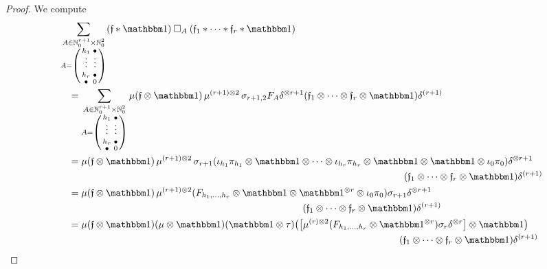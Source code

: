 \documentclass[\MainFolder/Text.tex]{subfiles}
\begin{document}
\begin{proof}
We compute
\begin{align*}
& \sum_{\substack{A \in \N_0^{r+1} \times \N_0^{2} \\ A = \left(\begin{smallmatrix}
h_1 & \bullet \\
\vphantom{\int\limits^x}\smash{\vdots} & \smash{\vdots} \\
h_r & \bullet \\ 
\bullet & 0
\end{smallmatrix}\right)}} (\MVMorF\Star\Id)\SquareComp_A (\MVMorF_1\Star\dotsb\Star\MVMorF_r \Star \Id) \\
&\quad =\sum_{\substack{A \in \N_0^{r+1} \times \N_0^{2} \\ A = \left(\begin{smallmatrix}
h_1 & \bullet \\
\vphantom{\int\limits^x}\smash{\vdots} & \smash{\vdots} \\
h_r & \bullet \\ 
\bullet & 0
\end{smallmatrix}\right)}} \MVProd(\MVMorF \otimes \Id)\Prod^{(r+1)\otimes 2}\sigma_{r+1,2}F_A\MVCoProd^{\otimes r+1}(\MVMorF_1 \otimes \dotsb \otimes \MVMorF_{r}\otimes\Id)\MVCoProd^{(r+1)} \\
&\quad = \begin{multlined}[t]\MVProd(\MVMorF \otimes \Id)\Prod^{(r+1)\otimes 2}\sigma_{r+1}(\iota_{h_1}\pi_{h_1}\otimes \Id \otimes\dotsb \otimes\iota_{h_r}\pi_{h_r}\otimes \Id\otimes  \Id \otimes \iota_0\pi_0)\MVCoProd^{\otimes r+1} \\ (\MVMorF_1 \otimes \dotsb \otimes \MVMorF_{r}\otimes\Id)\MVCoProd^{(r+1)}\end{multlined}\\
&\quad = \begin{multlined}[t]\MVProd(\MVMorF \otimes \Id)\Prod^{(r+1)\otimes 2}(F_{h_1,\dotsc,h_r}\otimes \Id\otimes  \Id^{\otimes r} \otimes \iota_0\pi_0)\sigma_{r+1} \MVCoProd^{\otimes r+1} \\ (\MVMorF_1 \otimes \dotsb \otimes \MVMorF_{r}\otimes\Id)\MVCoProd^{(r+1)}\end{multlined} \\
&\quad =\begin{multlined}[t]\MVProd(\MVMorF\otimes \Id)(\MVProd\otimes\Id)(\Id\otimes \tau)\bigl(\bigl[\MVProd^{(r)\otimes 2}(F_{h_1,\dotsc,h_r} \otimes \Id^{\otimes r})\sigma_r\MVCoProd^{\otimes r}\bigr] \otimes \Id \bigr)\\(\MVMorF_1\otimes \dotsb \otimes \MVMorF_r\otimes \Id)\MVCoProd^{(r+1)}\end{multlined} \\

\end{align*}
\end{proof}
\end{document}
